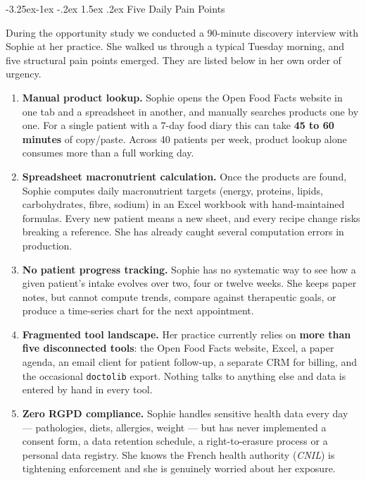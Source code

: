 \documentclass[a4paper,11pt,oneside,openany]{report}
\makeatletter
\renewcommand\subsection{\@startsection{subsection}{2}{\z@}%
  {-3.25ex\@plus -1ex \@minus -.2ex}%
  {1.5ex \@plus .2ex}%
  {\normalfont\large\bfseries\color{ntdarkgreen}}}
\newcommand{\off}{Open Food Facts}
\newcommand{\rgpd}{RGPD}
\makeatother
\begin{document}
\subsection{Five Daily Pain Points}

During the opportunity study we conducted a 90-minute discovery
interview with Sophie at her practice. She walked us through a typical
Tuesday morning, and five structural pain points emerged. They are
listed below in her own order of urgency.

\begin{enumerate}[nosep]
  \item \textbf{Manual product lookup.} Sophie opens the
        \off{} website in one tab and a spreadsheet in another, and
        manually searches products one by one. For a single patient
        with a 7-day food diary this can take \textbf{45 to 60
        minutes} of copy/paste. Across 40 patients per week, product
        lookup alone consumes more than a full working day.
  \item \textbf{Spreadsheet macronutrient calculation.} Once the
        products are found, Sophie computes daily macronutrient
        targets (energy, proteins, lipids, carbohydrates, fibre,
        sodium) in an Excel workbook with hand-maintained formulas.
        Every new patient means a new sheet, and every recipe change
        risks breaking a reference. She has already caught several
        computation errors in production.
  \item \textbf{No patient progress tracking.} Sophie has no
        systematic way to see how a given patient's intake evolves
        over two, four or twelve weeks. She keeps paper notes, but
        cannot compute trends, compare against therapeutic goals, or
        produce a time-series chart for the next appointment.
  \item \textbf{Fragmented tool landscape.} Her practice currently
        relies on \textbf{more than five disconnected tools}: the
        \off{} website, Excel, a paper agenda, an email client for
        patient follow-up, a separate CRM for billing, and the
        occasional \texttt{doctolib} export. Nothing talks to
        anything else and data is entered by hand in every tool.
  \item \textbf{Zero \rgpd{} compliance.} Sophie handles sensitive
        health data every day --- pathologies, diets, allergies,
        weight --- but has never implemented a consent form, a data
        retention schedule, a right-to-erasure process or a personal
        data registry. She knows the French health authority
        (\textit{CNIL}) is tightening enforcement and she is
        genuinely worried about her exposure.
\end{enumerate}
\end{document}
